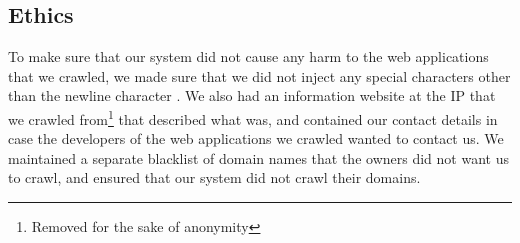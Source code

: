 \subsection{Ethics}

To make sure that our system did not cause any harm to the web applications that we crawled, we made sure that we did not inject any special characters other than the newline character%
. We also had an information website at the IP that we crawled from\footnote{Removed for the sake of anonymity} that described what \ehi was, and contained our contact details in case the developers of the web applications we crawled wanted to contact us. We maintained a separate blacklist of domain names that the owners did not want us to crawl, and ensured that our system did not crawl their domains.

